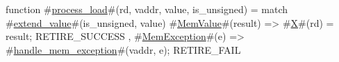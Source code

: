 function #\hyperref[sailRISCVzprocesszyload]{process\_load}#(rd, vaddr, value, is_unsigned) =
  match #\hyperref[sailRISCVzextendzyvalue]{extend\_value}#(is_unsigned, value) {
    #\hyperref[sailRISCVzMemValue]{MemValue}#(result) => { #\hyperref[sailRISCVzX]{X}#(rd) = result; RETIRE_SUCCESS },
    #\hyperref[sailRISCVzMemException]{MemException}#(e)  => { #\hyperref[sailRISCVzhandlezymemzyexception]{handle\_mem\_exception}#(vaddr, e); RETIRE_FAIL }
  }
